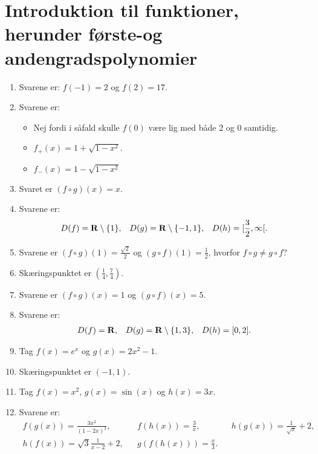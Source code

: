 \section{Introduktion til funktioner, herunder første-og andengradspolynomier}
\begin{enumerate}
	
	\item Svarene er: $f(-1)=2$ og $f(2)=17$.
	
	\item Svarene er:
	\begin{itemize}
		\item Nej fordi i såfald skulle $f(0)$ være lig med både $2$ og $0$ samtidig.
		\item $f_+(x) = 1+\sqrt{1-x^2}$.
		\item $f_-(x) = 1-\sqrt{1-x^2}$
	\end{itemize}	
	
	\item Svaret er $(f\circ g)(x)=x$.
	

	\item Svarene er:
	\begin{align*}
	D(f)=\mathbf{R}\setminus\{1\},&& D(g)=\mathbf{R}\setminus \{-1,1\},&& D(h)=[\frac{3}{2},\infty[.
	\end{align*}	
	
	\item  Svarene er $(f\circ g)(1)=\frac{\sqrt{2}}{2}$ og $(g\circ f)(1)=\frac{1}{2}$, hvorfor $f\circ g\neq g\circ f$?
	
	\item Skæringspunktet er $(\frac{1}{4},\frac{7}{4})$.	
	
		\item Svarene er $(f\circ g)(x)=1$ og $(g\circ f)(x)=5$.
	
		\item Svarene er:
	\begin{align*}
	D(f)=\mathbf{R},&& D(g)=\mathbf{R}\setminus\{1,3\},&& D(h)=[0,2].
	\end{align*}
	
	
	

	\item Tag $f(x)=e^x$ og $g(x)=2x^2-1$.
	
	\item Skæringspunktet er $(-1,1)$.
	
	\item Tag $f(x)=x^2$, $g(x)=\sin(x)$ og $h(x)=3x$.
	
	\item Svarene er:
	\begin{align*}
	f(g(x))=\frac{3x^2}{(1-2x)^2},&& f(h(x))=\frac{3}{x},&& h(g(x))=\frac{1}{\sqrt{x}}+2,\\ h(f(x))=\sqrt{3}\frac{1}{x-2}+2,&&g(f(h(x)))=\frac{x}{3}.
	\end{align*} 
	

\end{enumerate}

